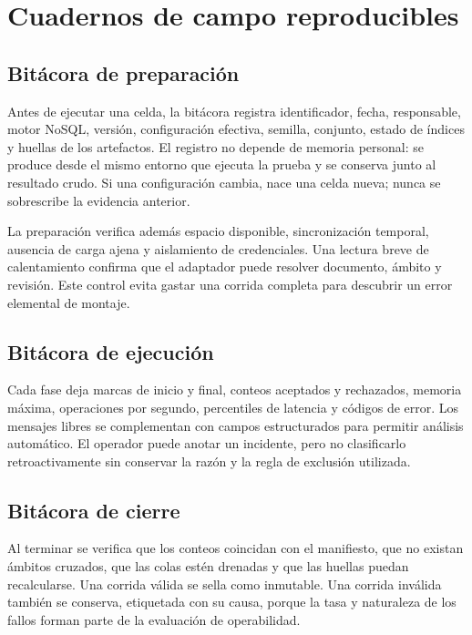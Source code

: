 \chapter{Cuadernos de campo reproducibles}

\section{Bitácora de preparación}

Antes de ejecutar una celda, la bitácora registra identificador, fecha, responsable,
motor NoSQL, versión, configuración efectiva, semilla, conjunto, estado de índices y
huellas de los artefactos. El registro no depende de memoria personal: se produce desde
el mismo entorno que ejecuta la prueba y se conserva junto al resultado crudo. Si una
configuración cambia, nace una celda nueva; nunca se sobrescribe la evidencia anterior.

La preparación verifica además espacio disponible, sincronización temporal, ausencia de
carga ajena y aislamiento de credenciales. Una lectura breve de calentamiento confirma
que el adaptador puede resolver documento, ámbito y revisión. Este control evita gastar
una corrida completa para descubrir un error elemental de montaje.

\section{Bitácora de ejecución}

Cada fase deja marcas de inicio y final, conteos aceptados y rechazados, memoria máxima,
operaciones por segundo, percentiles de latencia y códigos de error. Los mensajes libres
se complementan con campos estructurados para permitir análisis automático. El operador
puede anotar un incidente, pero no clasificarlo retroactivamente sin conservar la razón y
la regla de exclusión utilizada.

\section{Bitácora de cierre}

Al terminar se verifica que los conteos coincidan con el manifiesto, que no existan
ámbitos cruzados, que las colas estén drenadas y que las huellas puedan recalcularse.
Una corrida válida se sella como inmutable. Una corrida inválida también se conserva,
etiquetada con su causa, porque la tasa y naturaleza de los fallos forman parte de la
evaluación de operabilidad.

